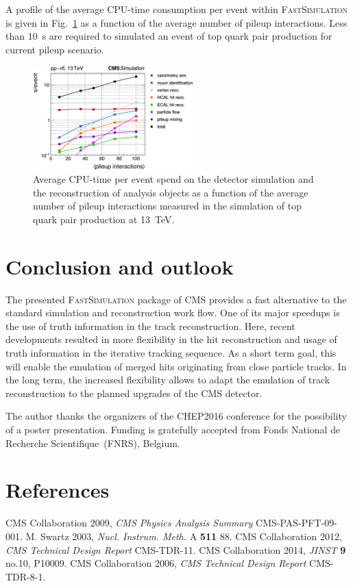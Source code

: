 \documentclass[a4paper]{jpconf}
\begin{document}
A profile of the average CPU-time consumption per event within \textsc{FastSimulation} is given in Fig.~\ref{fig:cpu} as a function of the average number of pileup interactions. Less than 10~s are required to simulated an event of top quark pair production for current pileup scenario.



\begin{figure}[htbp]
\begin{center}
\includegraphics[width=0.55\textwidth]{figures/cpu_profile.pdf}
\caption{\label{fig:cpu}Average CPU-time per event spend on the detector simulation and the reconstruction of analysis objects as a function of the average number of pileup interactions measured in the simulation of top quark pair production at 13~TeV.}
\end{center}
\end{figure}

\section{Conclusion and outlook}

The presented \textsc{FastSimulation} package of CMS provides a fast alternative to the standard simulation and reconstruction work flow. One of its major speedups is the use of truth information in the track reconstruction. Here, recent developments resulted in more flexibility in the hit reconstruction and usage of truth information in the iterative tracking sequence. As a short term goal, this will enable the emulation of merged hits originating from close particle tracks. In the long term, the increased flexibility allows to adapt the emulation of track reconstruction to the planned upgrades of the CMS detector.

\ack
The author thanks the organizers of the \textsc{CHEP2016} conference for the possibility of a poster presentation. Funding is gratefully accepted from Fonds National de Recherche Scientifique~(FNRS), Belgium.


\section{References}
\begin{thebibliography}{99}
 CMS Collaboration 2009, {\it CMS Physics Analysis Summary} CMS-PAS-PFT-09-001.
 M. Swartz 2003, {\it Nucl. Instrum. Meth.} A \textbf{511} 88.
 CMS Collaboration 2012, {\it CMS Technical Design Report} CMS-TDR-11.
 CMS Collaboration 2014, {\it JINST} \textbf{9} no.10, P10009.
 CMS Collaboration 2006, {\it CMS Technical Design Report} CMS-TDR-8-1.

\end{thebibliography}
\end{document}
